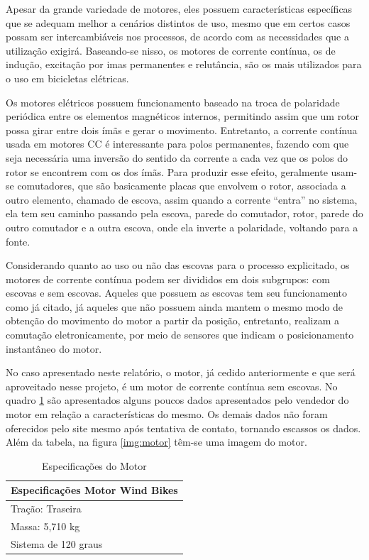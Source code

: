 Apesar da grande variedade de motores, eles possuem características específicas que se adequam melhor a cenários distintos de uso, mesmo que em certos casos possam ser intercambiáveis nos processos, de acordo com as necessidades que a utilização exigirá. Baseando-se nisso, os motores de corrente contínua, os de indução, excitação por imas permanentes e relutância, são os mais utilizados para o uso em bicicletas elétricas.

Os motores elétricos possuem funcionamento baseado na troca de polaridade periódica entre os elementos magnéticos internos, permitindo assim que um rotor possa girar entre dois ímãs e gerar o movimento. Entretanto, a corrente contínua usada em motores CC é interessante para polos permanentes, fazendo com que seja necessária uma inversão do sentido da corrente a cada vez que os polos do rotor se encontrem com os dos ímãs. Para produzir esse efeito, geralmente usam-se comutadores, que são basicamente placas que envolvem o rotor, associada a outro elemento, chamado de escova, assim quando a corrente “entra” no sistema, ela tem seu caminho passando pela escova, parede do comutador, rotor, parede do outro comutador e a outra escova, onde ela inverte a polaridade, voltando para a fonte. 
 
 Considerando quanto ao uso ou não das escovas para o processo explicitado, os motores de corrente contínua podem ser divididos em dois subgrupos: com escovas e sem escovas. Aqueles que possuem as escovas tem seu funcionamento como já citado, já aqueles que não possuem ainda mantem o mesmo modo de obtenção do movimento do motor a partir da posição, entretanto, realizam a comutação eletronicamente, por meio de sensores que indicam o posicionamento instantâneo do motor. 

No caso apresentado neste relatório, o motor, já cedido anteriormente e que será aproveitado nesse projeto, é um motor de corrente contínua sem escovas. No quadro \ref{esp_motor} são apresentados alguns poucos dados apresentados pelo vendedor do motor em relação a características do mesmo. Os demais dados não foram oferecidos pelo site mesmo após tentativa de contato, tornando escassos os dados. Além da tabela, na figura \ref{img:motor} têm-se uma imagem do motor.

\begin{table}[h!]
\centering
\caption{Especificações do Motor}
\label{esp_motor}
\begin{tabular}{|l|}
\hline
Especificações Motor Wind Bikes \\ \hline
Tração: Traseira                \\ \hline
Massa: 5,710 kg                 \\ \hline
Sistema de 120 graus            \\ \hline
\end{tabular}
\end{table}

